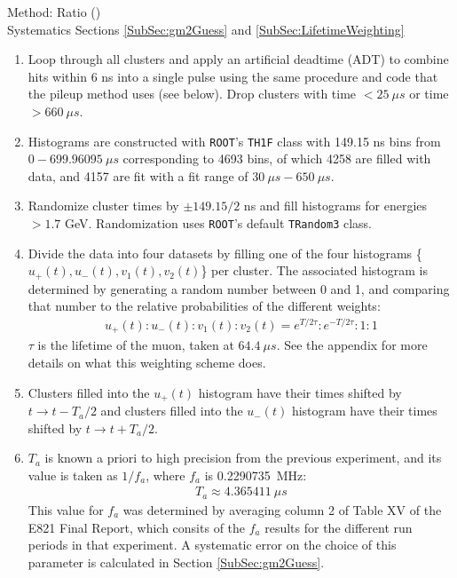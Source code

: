 	Method: Ratio () \\
	\noindent Systematics Sections \ref{SubSec:gm2Guess} and \ref{SubSec:LifetimeWeighting}

	\begin{enumerate}
		\item{Loop through all clusters and apply an artificial deadtime (ADT) to combine hits within 6 ns into a single pulse using the same procedure and code that the pileup method uses (see below). Drop clusters with time $< \SI{25}{\mu s}$ or time $> \SI{660}{\mu s}$.}
		\item{Histograms are constructed with \texttt{ROOT}'s \texttt{TH1F} class with 149.15 ns bins from $0 - \SI{699.96095}{\mu s}$ corresponding to 4693 bins, of which 4258 are filled with data, and 4157 are fit with a fit range of $\SI{30}{\mu s} - \SI{650}{\mu s}$.}
		\item{Randomize cluster times by $\pm 149.15/2$ ns and fill histograms for energies $> 1.7$ GeV. Randomization uses \texttt{ROOT}'s default \texttt{TRandom3} class.}
		\item{Divide the data into four datasets by filling one of the four histograms \{$u_{+}(t), u_{-}(t), v_{1}(t), v_{2}(t)$\} per cluster. The associated histogram is determined by generating a random number between 0 and 1, and comparing that number to the relative probabilities of the different weights:
			\begin{align}
				u_{+}(t) : u_{-}(t) : v_{1}(t) : v_{2}(t) = e^{T/2\tau} : e^{-T/2\tau} : 1 : 1
			\end{align}
		$\tau$ is the lifetime of the muon, taken at $\SI{64.4}{\mu s}$. See the appendix for more details on what this weighting scheme does.}
		\item{Clusters filled into the $u_{+}(t)$ histogram have their times shifted by $t \rightarrow t - T_{a}/2$ and clusters filled into the $u_{-}(t)$ histogram have their times shifted by $t \rightarrow t + T_{a}/2$.}
		\item{$T_{a}$ is known a priori to high precision from the previous experiment, and its value is taken as $1/f_{a}$, where $f_{a}$ is \SI{0.2290735}{MHz}:
			\begin{align}
				T_{a} \approx \SI{4.365411}{\mu s}
			\label{eq:Ta}
			\end{align}
		This value for $f_{a}$ was determined by averaging column 2 of Table XV of the E821 Final Report, which consits of the $f_{a}$ results for the different run periods in that experiment. A systematic error on the choice of this parameter is calculated in Section \ref{SubSec:gm2Guess}.}
	\end{enumerate}

